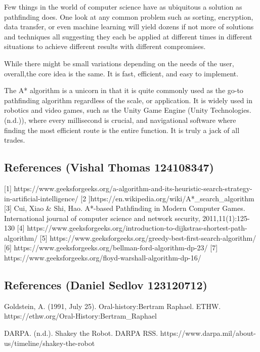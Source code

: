 \documentclass[11pt]{article}
\begin{document}
Few things in the world of computer science have as ubiquitous a
solution as pathfinding does. One look at any common problem such as
sorting, encryption, data transfer, or even machine learning will yield
dozens if not more of solutions and techniques all suggesting they each
be applied at different times in different situations to achieve
different results with different compromises.

While there might be small variations depending on the needs of the
user, overall,the core idea is the same. It is fast, efficient, and easy
to implement.

The A* algorithm is a unicorn in that it is quite commonly used as the
go-to pathfinding algorithm regardless of the scale, or application. It
is widely used in robotics and video games, such as the Unity Game
Engine (Unity Technologies. (n.d.)), where every millisecond is crucial,
and navigational software where finding the most efficient route is the
entire function. It is truly a jack of all trades.

    \subsection{References (Vishal Thomas
124108347)}\label{references-vishal-thomas-124108347}

{[}1{]}
https://www.geeksforgeeks.org/a-algorithm-and-its-heuristic-search-strategy-in-artificial-intelligence/
{[}2 {]}https://en.wikipedia.org/wiki/A*\_search\_algorithm {[}3{]} Cui,
Xiao \& Shi, Hao. A*-based Pathfinding in Modern Computer Games.
International journal of computer science and network security,
2011,11(1):125-130 {[}4{]}
https://www.geeksforgeeks.org/introduction-to-dijkstras-shortest-path-algorithm/
{[}5{]}
https://www.geeksforgeeks.org/greedy-best-first-search-algorithm/
{[}6{]} https://www.geeksforgeeks.org/bellman-ford-algorithm-dp-23/
{[}7{]} https://www.geeksforgeeks.org/floyd-warshall-algorithm-dp-16/

    \subsection{References (Daniel Sedlov
123120712)}\label{references-daniel-sedlov-123120712}

Goldstein, A. (1991, July 25). Oral-history:Bertram Raphael. ETHW.
https://ethw.org/Oral-History:Bertram\_Raphael

DARPA. (n.d.). Shakey the Robot. DARPA RSS.
https://www.darpa.mil/about-us/timeline/shakey-the-robot
\end{document}
